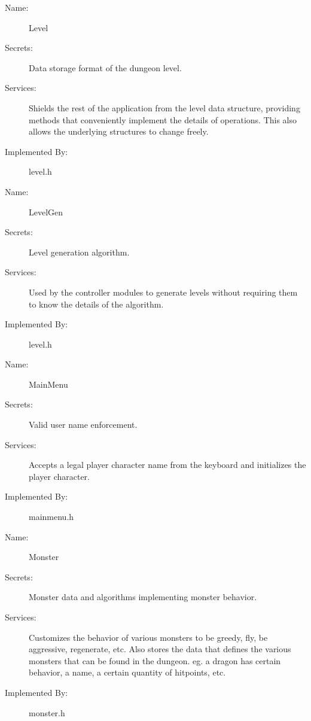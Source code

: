 \documentclass[12pt, titlepage]{article}
\begin{document}
        \bigskip\begin{description}
            \item[Name:]Level
            \item[Secrets:]Data storage format of the dungeon level.
            \item[Services:]Shields the rest of the application from the level data structure, providing methods that conveniently implement the details of operations. This also allows the underlying structures to change freely.
            \item[Implemented By:]level.h
        \end{description}

        \bigskip\begin{description}
            \item[Name:]LevelGen
            \item[Secrets:]Level generation algorithm.
            \item[Services:]Used by the controller modules to generate levels without requiring them to know the details of the algorithm.
            \item[Implemented By:]level.h
        \end{description}

        \bigskip\begin{description}
            \item[Name:]MainMenu
            \item[Secrets:]Valid user name enforcement.
            \item[Services:]Accepts a legal player character name from the keyboard and initializes the player character.
            \item[Implemented By:]mainmenu.h
        \end{description}

        \bigskip\begin{description}
            \item[Name:]Monster
            \item[Secrets:]Monster data and algorithms implementing monster behavior.
            \item[Services:]Customizes the behavior of various monsters to be greedy, fly, be aggressive, regenerate, etc. Also stores the data that defines the various monsters that can be found in the dungeon. eg. a dragon has certain behavior, a name, a certain quantity of hitpoints, etc.
            \item[Implemented By:]monster.h
        \end{description}
\end{document}
